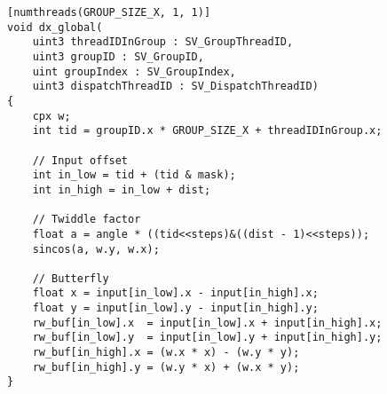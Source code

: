\begin{lstlisting}
[numthreads(GROUP_SIZE_X, 1, 1)]
void dx_global(
    uint3 threadIDInGroup : SV_GroupThreadID,
    uint3 groupID : SV_GroupID,
    uint groupIndex : SV_GroupIndex,
    uint3 dispatchThreadID : SV_DispatchThreadID)
{
    cpx w;
    int tid = groupID.x * GROUP_SIZE_X + threadIDInGroup.x;
	
    // Input offset
    int in_low = tid + (tid & mask);
    int in_high = in_low + dist;    
    
    // Twiddle factor
    float a = angle * ((tid<<steps)&((dist - 1)<<steps));
    sincos(a, w.y, w.x);	
    
    // Butterfly
    float x = input[in_low].x - input[in_high].x;
    float y = input[in_low].y - input[in_high].y;
    rw_buf[in_low].x  = input[in_low].x + input[in_high].x;
    rw_buf[in_low].y  = input[in_low].y + input[in_high].y;
    rw_buf[in_high].x = (w.x * x) - (w.y * y);
    rw_buf[in_high].y = (w.y * x) + (w.x * y);
}
\end{lstlisting}